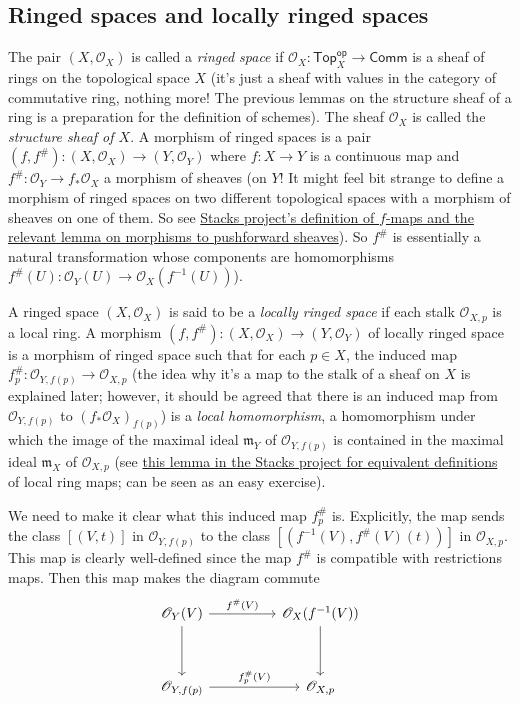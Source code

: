 \documentclass[12pt]{article}
\theoremstyle{remark}
\newcommand{\Top}[0]{\mathsf{Top}}
\newcommand{\op}[0]{\mathsf{op}}
\begin{document}
	\subsection{Ringed spaces and locally ringed spaces}\label{ssec-ringed}
	
	The pair $(X, \mathscr O_X)$ is called a \textit{ringed space} if $\mathscr O_X:\Top_X^\op\to \mathsf{Comm}$ is a sheaf of rings on the topological space $X$ (it's just a sheaf with values in the category of commutative ring, nothing more! The previous lemmas on the structure sheaf of a ring is a preparation for the definition of schemes). The sheaf $\mathscr O_X$ is called the \textit{structure sheaf of $X$}. A morphism of ringed spaces is a pair $(f, f^\#):(X, \mathscr O_X)\to (Y, \mathscr O_Y)$ where $f:X\to Y$ is a continuous map and $f^\#:\mathscr O_Y\to f_*\mathscr O_X$ a morphism of sheaves (on $Y$! It might feel bit strange to define a morphism of ringed spaces on two different topological spaces with a morphism of sheaves on one of them. So see \href{https://stacks.math.columbia.edu/tag/008K}{Stacks project's definition of $f$-maps and the relevant lemma on morphisms to pushforward sheaves}). So $f^\#$ is essentially a natural transformation whose components are homomorphisms $f^\#(U):\mathscr O_Y(U)\to \mathscr O_X(f^{-1}(U))$).
	
	A ringed space $(X, \mathscr O_X)$ is said to be a \textit{locally ringed space} if each stalk $\mathscr O_{X, p}$ is a local ring. A morphism $(f, f^\#): (X, \mathscr O_X)\to (Y, \mathscr O_Y)$ of locally ringed space is a morphism of ringed space such that for each $p\in X$, the induced map $f^\#_p:\mathscr O_{Y, f(p)}\to \mathscr O_{X, p}$ (the idea why it's a map to the stalk of a sheaf on $X$ is explained later; however, it should be agreed that there is an induced map from $\mathscr O_{Y, f(p)}$ to $(f_*\mathscr O_X)_{f(p)}$) is a \textit{local homomorphism}, a homomorphism under which the image of the maximal ideal $\mathfrak m_{Y}$ of $\mathscr O_{Y, f(p)}$ is contained in the maximal ideal $\mathfrak m_{X}$ of $\mathscr O_{X, p}$ (see \href{https://stacks.math.columbia.edu/tag/07BJ}{this lemma in the Stacks project for equivalent definitions} of local ring maps; can be seen as an easy exercise).
	
	We need to make it clear what this induced map $f^\#_{p}$ is. Explicitly, the map sends the class $[(V, t)]$ in $\mathscr O_{Y, f(p)}$ to the class $[(f^{-1}(V), f^\#(V)(t))]$ in $\mathscr O_{X, p}$. This map is clearly well-defined since the map $f^\#$ is compatible with restrictions maps. Then this map makes the diagram commute
	\[
	\begin{tikzcd}
\mathscr O_{Y}(V) \arrow[rr, "f^\#(V)"] \arrow[dd] &  & \mathscr O_{X}(f^{-1}(V)) \arrow[dd] \\
                                                   &  &                                      \\
{\mathscr O_{Y, f(p)}} \arrow[rr, "f^\#_p(V)"]     &  & {\mathscr O_{X, p}}                 
\end{tikzcd}	
	\]
	
\end{document}
